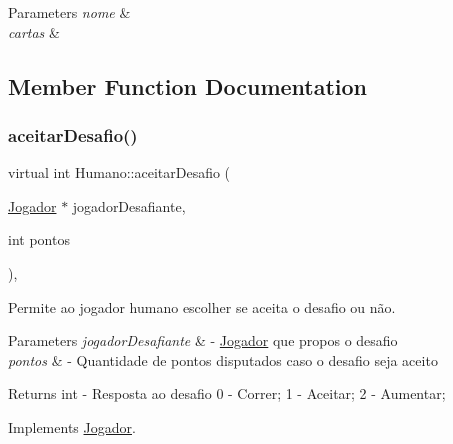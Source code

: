 \begin{DoxyParams}{Parameters}
{\em nome} & \\
\hline
{\em cartas} & \\
\hline
\end{DoxyParams}


\subsection{Member Function Documentation}
\mbox{\label{class_humano_aa1cd4b8c801b73190ad1472f6fc860b1}} 
\subsubsection{\texorpdfstring{aceitarDesafio()}{aceitarDesafio()}}
{\footnotesize\ttfamily virtual int Humano\+::aceitar\+Desafio (\begin{DoxyParamCaption}\item[{\mbox{\hyperlink{class_jogador}{Jogador}} $\ast$}]{jogador\+Desafiante,  }\item[{int}]{pontos }\end{DoxyParamCaption})\hspace{0.3cm}{\ttfamily [override]}, {\ttfamily [virtual]}}



Permite ao jogador humano escolher se aceita o desafio ou não. 


\begin{DoxyParams}{Parameters}
{\em jogador\+Desafiante} & -\/ \mbox{\hyperlink{class_jogador}{Jogador}} que propos o desafio \\
\hline
{\em pontos} & -\/ Quantidade de pontos disputados caso o desafio seja aceito \\
\hline
\end{DoxyParams}
\begin{DoxyReturn}{Returns}
int -\/ Resposta ao desafio 0 -\/ Correr; 1 -\/ Aceitar; 2 -\/ Aumentar; 
\end{DoxyReturn}


Implements \mbox{\hyperlink{class_jogador_a4eceb45cff559f97cd441da30d36769c}{Jogador}}.

\mbox{\label{class_humano_a32767bbf1ad4f6065d18f375341ac00e}} 
